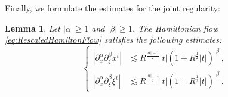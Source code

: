 \documentclass{amsart}
\newtheorem{lemma}[theorem]{Lemma}
\theoremstyle{definition}
\begin{document}
Finally, we formulate the estimates for the joint regularity:
\begin{lemma}
\label{lem:HamiltonFlowMixedRegularityII}
Let $|\alpha| \geq 1$ and $|\beta| \geq 1$. The Hamiltonian flow \eqref{eq:RescaledHamiltonFlow} satisfies the following estimates:
\begin{equation}
\label{eq:MixedRegularityHigherOrder}
\left\{ \begin{array}{cl}
| \partial_x^{\alpha} \partial_{\xi}^{\beta} x^t| &\lesssim R^{\frac{|\alpha|-1}{2}} |t| (1+R^{\frac{1}{2}} |t|)^{|\beta|}, \\
| \partial_x^{\alpha} \partial_{\xi}^{\beta} \xi^t| &\lesssim R^{\frac{|\alpha|-1}{2}} |t| (1+R^{\frac{1}{2}} |t|)^{|\beta|}.
\end{array} \right.
\end{equation}
\end{lemma}
\end{document}
